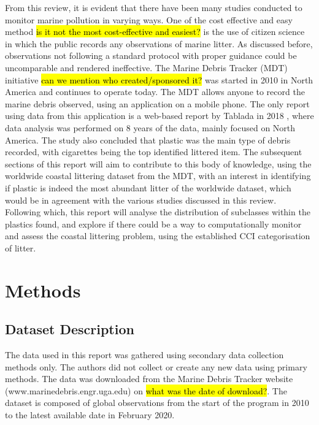 \documentclass[10pt]{article}\usepackage[]{graphicx}\usepackage[]{color}
\begin{document}
From this review, it is evident that there have been many studies conducted to monitor marine pollution in varying ways. One of the cost effective and easy method \hl{is it not the most cost-effective and easiest?} is the use of citizen science in which the public records any observations of marine litter. As discussed before, observations not following a standard protocol with proper guidance could be uncomparable and rendered ineffective. The Marine Debris Tracker (MDT) initiative \hl{can we mention who created/sponsored it?} was started in 2010 in North America and continues to operate today. The MDT allows anyone to record the marine debris observed, using an application on a mobile phone. The only report using data from this application is a web-based report by Tablada in 2018 \cite{JAMBECK2015B}, where data analysis was performed on 8 years of the data, mainly focused on North America. The study also concluded that plastic was the main type of debris recorded, with cigarettes being the top identified littered item. The subsequent sections of this report will aim to contribute to this body of knowledge, using the worldwide coastal littering dataset from the MDT, with an interest in identifying if plastic is indeed the most abundant litter of the worldwide dataset, which would be in agreement with the various studies discussed in this review. Following which, this report will analyse the distribution of subclasses within the plastics found, and explore if there could be a way to computationally monitor and assess the coastal littering problem, using the established CCI categorisation of litter. \\
















\pagebreak
\section {Methods}\label{methods}

\subsection{Dataset Description}\label{dataset}

The data used in this report was gathered using secondary data collection methods only. The authors did not collect or create any new data using primary methods. The data was downloaded from the Marine Debris Tracker website (www.marinedebris.engr.uga.edu) on \hl{what was the date of download?}. The dataset is composed of global observations from the start of the program in 2010 to the latest available date in February 2020. \\
\end{document}
